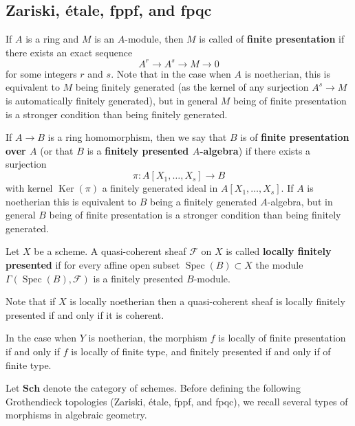 \documentclass[12pt]{article}
\begin{document}
\subsection{Zariski, étale, fppf, and fpqc}

\begin{definition}
    If $A$ is a ring and $M$ is an $A$-module, then $M$ is called of \textbf{finite presentation} if there exists an exact sequence
    \[
        A^r \to A^s \to M \to 0
    \]
    for some integers $r$ and $s$. Note that in the case when $A$ is noetherian, this is equivalent to $M$ being finitely generated (as the kernel of any surjection $A^s \to M$ is automatically finitely generated), but in general $M$ being of finite presentation is a stronger condition than being finitely generated.

    If $A \to B$ is a ring homomorphism, then we say that $B$ is of \textbf{finite presentation over $A$} (or that $B$ is a \textbf{finitely presented $A$-algebra}) if there exists a surjection
    \[
        \pi : A[X_1,\ldots,X_s] \to B
    \]
    with kernel $\operatorname{Ker}(\pi)$ a finitely generated ideal in $A[X_1,\ldots,X_s]$. If $A$ is noetherian this is equivalent to $B$ being a finitely generated $A$-algebra, but in general $B$ being of finite presentation is a stronger condition than being finitely generated.

    Let $X$ be a scheme. A quasi-coherent sheaf $\mathcal{F}$ on $X$ is called \textbf{locally finitely presented} if for every affine open subset $\operatorname{Spec}(B) \subset X$ the module $\Gamma(\operatorname{Spec}(B), \mathcal{F})$ is a finitely presented $B$-module.

    Note that if $X$ is locally noetherian then a quasi-coherent sheaf is locally finitely presented if and only if it is coherent.

    In the case when $Y$ is noetherian, the morphism $f$ is locally of finite presentation if and only if $f$ is locally of finite type, and finitely presented if and only if of finite type.

\end{definition}

Let $\mathbf{Sch}$ denote the category of schemes. Before defining the following Grothendieck topologies (Zariski, étale, fppf, and fpqc), we recall several types of morphisms in algebraic geometry.
\end{document}
